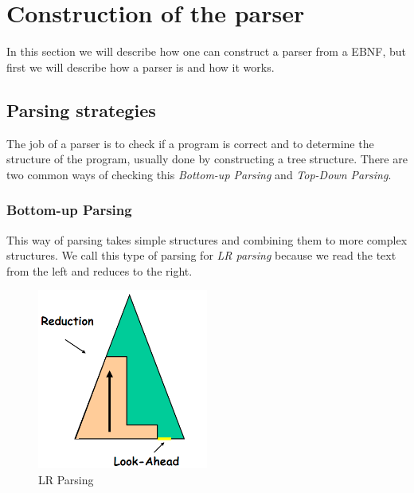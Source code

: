 \section{Construction of the parser}
	In this section we will describe how one can construct a parser from a EBNF, but first we will describe how a parser is and how it works.
	
	\subsection{Parsing strategies}
		The job of a parser is to check if a program is correct and 
		to determine the structure of the program, usually done by constructing a tree structure.
		There are two common ways of checking this {\it Bottom-up Parsing} and {\it Top-Down Parsing}.
		
		\subsubsection*{Bottom-up Parsing}
			This way of parsing takes simple structures and combining them to more complex structures.
			We call this type of parsing for {\it LR parsing} because we read the text from the left and reduces to the right.
			\begin{figure}[H]
				\centering
				\includegraphics[width=0.5\textwidth]{rapport/2/figures/bottomup.png}
				\caption{LR Parsing}\label{fig:lrparse}
			\end{figure}
			
